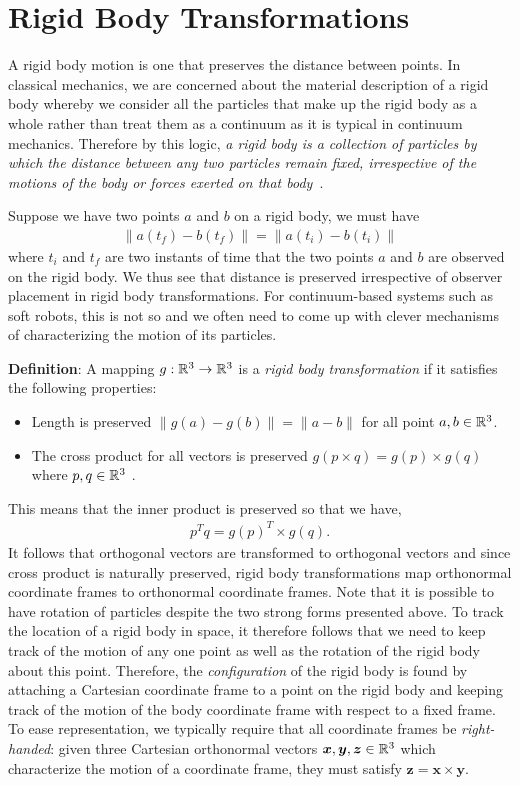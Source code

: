 \section{Rigid Body Transformations}

A rigid body motion is one that preserves the  distance between points. In classical mechanics, we are concerned about the material description of a rigid body whereby we consider all the particles that make up the rigid body as a whole rather than treat them as a continuum as it is typical in continuum mechanics.  Therefore by this logic, \textit{a rigid body is a collection of particles by which the distance between any two particles remain fixed, irrespective of the motions of the body or forces exerted on that body~\cite{MurrayBook}}. 

Suppose we have two points $a$ and $b$ on a rigid body, we must have
%
\begin{align}
\|a(t_f) - b(t_f)\| = \|a(t_i) - b(t_i)\|
\end{align}
%
where $t_i$ and $t_f$ are two instants of time that the two points \ie $a$ and $b$ are observed on the rigid body. We thus see that distance is preserved irrespective of observer placement in rigid body transformations. For continuum-based systems such as soft robots, this is not so and we often need to come up with clever mechanisms of characterizing the motion of its particles. 

\noindent \textbf{Definition}: A mapping $g: \mathbb{R}^3\rightarrow\mathbb{R}^3$ is a \textit{rigid body transformation} if it satisfies the following properties:
\begin{itemize}
	\item Length is preserved \ie $\|g(a) - g(b)\| = \|a-b\|$ for all point $a, b \in \mathbb{R}^3$.
	\item The cross product for all vectors is preserved \ie $g(p \times q) = g(p) \times g(q)$ where $p, q \in \mathbb{R}^3$ .
\end{itemize}
%
This means that the inner product is preserved so that we have, 
\begin{align}
p^Tq = g(p)^T \times g(q).
\end{align}
%
It follows that orthogonal vectors are transformed to orthogonal vectors and since cross product is naturally preserved, rigid body transformations map orthonormal coordinate frames to orthonormal coordinate frames. Note that it is possible to have rotation of particles despite the two strong forms presented above. To track the location of a rigid body in space, it therefore follows that we need to keep track of the motion of any one point as well as the rotation of the rigid body about this point. Therefore, the \textit{configuration} of the rigid body is found by attaching a Cartesian coordinate frame to a point on the rigid body and keeping track of the motion of the body coordinate frame with respect to a fixed frame. To ease representation, we typically require that all coordinate frames be \textit{right-handed}: given three Cartesian orthonormal vectors $\bm{x}, \bm{y}, \bm{z} \in \mathbb{R}^3$ which characterize the motion of a coordinate frame, they must satisfy $\bm{z} = \bm{x} \times \bm{y}$.


